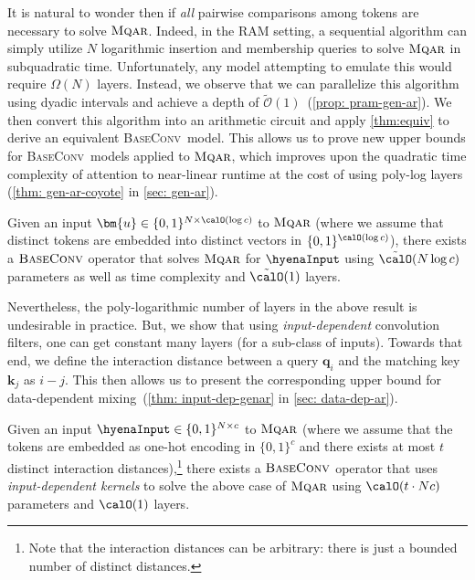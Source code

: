 It is natural to wonder then if \textit{all} pairwise comparisons among tokens are necessary to solve $\textsc{Mqar}$. Indeed, in the RAM setting, a sequential algorithm can simply utilize $N$ logarithmic insertion and membership queries to solve $\textsc{Mqar}$ in subquadratic time. Unfortunately, any model attempting to emulate this would require $\Omega(N)$ layers. Instead, we observe that we can parallelize this algorithm using dyadic intervals and achieve a depth of $\tilde{\mathcal{O}}(1)$~(\ref{prop: pram-gen-ar}). We then convert this algorithm into an arithmetic circuit and apply \ref{thm:equiv} to derive an equivalent \textsc{BaseConv}\ model. This allows us to prove new upper bounds for \textsc{BaseConv}\ models applied to $\textsc{Mqar}$, which improves upon the quadratic time complexity of attention to near-linear runtime at the cost of using poly-log layers (\ref{thm: gen-ar-coyote} in \ref{sec: gen-ar}).

\begin{theorem}
    \label{thm: indep-genar} Given an input $\bm{u} \in \{0,1\}^{N \times \calO(\log{c})}$ to $\textsc{Mqar}$ (where we assume that distinct tokens are embedded into distinct vectors in $\{0,1\}^{\calO(\log{c})}$), there exists a ${\textsc{BaseConv}}$ operator that solves $\textsc{Mqar}$ for $\hyenaInput$ using $\tilde{\calO}(N\log{c})$ parameters as well as time complexity and $\tilde{\calO}(1)$ layers. 
\end{theorem}

Nevertheless, the poly-logarithmic number of layers in the above result is undesirable in practice. But, we show that using {\em input-dependent} convolution filters, one can get constant many layers (for a sub-class of inputs). Towards that end, we define the interaction distance between a query $\bm{q}_i$ and the matching key $\bm{k}_j$ as $i-j$. This then allows us to present the corresponding upper bound for data-dependent mixing~(\ref{thm: input-dep-genar} in \ref{sec: data-dep-ar}).

\begin{theorem}
    \label{thm: dep-genar} Given an input $\hyenaInput\in \{0,1\}^{N \times c}$ to $\textsc{Mqar}$ (where we assume that the tokens are embedded as one-hot encoding in $\{0,1\}^c$ and there exists at most $t$ distinct interaction distances),\footnote{Note that the interaction distances can be arbitrary: there is just a bounded number of distinct distances.} there exists a ${\textsc{BaseConv}}$ operator that uses {\em input-dependent kernels} to solve the above case of $\textsc{Mqar}$  using $\calO(t \cdot Nc)$ parameters and ${\calO}(1)$ layers.
\end{theorem}

